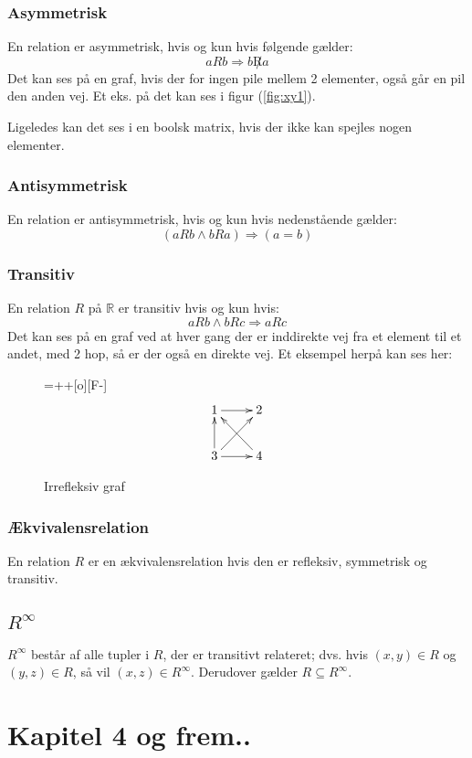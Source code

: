 \documentclass[a4paper]{article}
\begin{document}
    \subsubsection{Asymmetrisk}
    En relation er asymmetrisk, hvis og kun hvis følgende gælder:
    \begin{equation}
      aRb \Rightarrow b\not Ra
    \end{equation}
    Det kan ses på en graf, hvis der for ingen pile mellem 2 elementer, også går en pil den anden vej. Et eks. på det kan ses i figur (\ref{fig:xy1}).

    Ligeledes kan det ses i en boolsk matrix, hvis der ikke kan spejles nogen elementer.
    \subsubsection{Antisymmetrisk}
    En relation er antisymmetrisk, hvis og kun hvis nedenstående gælder:
    \begin{equation}
      (aRb \wedge bRa) \Rightarrow (a=b)
    \end{equation}

    \subsubsection{Transitiv}
    En relation $R$ på $\mathbb{R}$ er transitiv hvis og kun hvis:
    \begin{equation}
      aRb \wedge bRc \Rightarrow aRc
    \end{equation}
    Det kan ses på en graf ved at hver gang der er inddirekte vej fra et element til et andet, med 2 hop, så er der også en direkte vej. Et eksempel herpå kan ses her:
    \begin{figure}[H]
      \entrymodifiers={++[o][F-]}
      $$
      \xymatrix @-0pc {
        1 \ar[r] & 2 \\
        3 \ar[u] \ar[ru] \ar[r] &  4 \ar[ul] }
        $$
      \caption{Irrefleksiv graf} \label{fig:xy4}
    \end{figure}
    \subsubsection{Ækvivalensrelation}
      En relation $R$ er en ækvivalensrelation hvis den er refleksiv, symmetrisk og transitiv.
    \subsection{$R^\infty$}

$R^\infty$ består af alle tupler i $R$, der er transitivt relateret; dvs. hvis $(x, y) \in R$
og $(y, z) \in R$, så vil $(x, z) \in R^\infty$. Derudover gælder $R \subseteq R^\infty$.

\section{Kapitel 4 og frem..}
\end{document}
